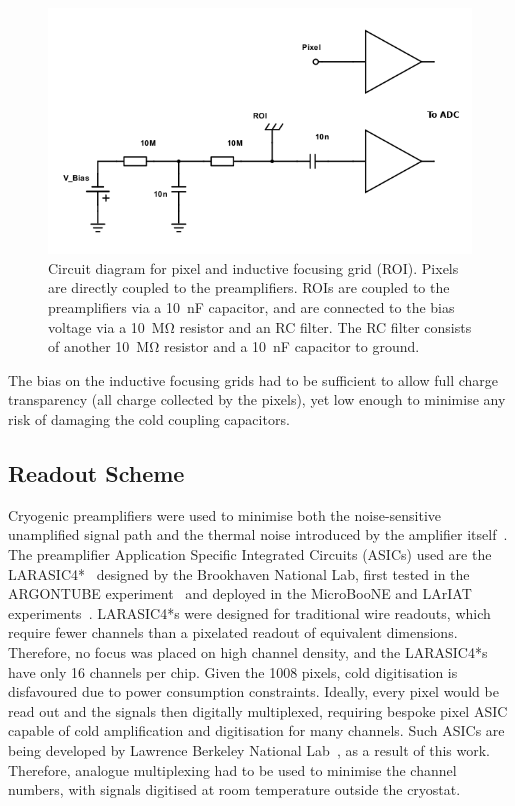 \documentclass[instruments,article,submit,moreauthors,pdftex]{Definitions/mdpi}
\begin{document}
\begin{figure}[htb]
	\centering
	\includegraphics[width=0.65\linewidth]{Figures/schemeit-project_mod}
	\caption{Circuit diagram for pixel and inductive focusing grid (ROI). Pixels are directly coupled to the preamplifiers. ROIs are coupled to the preamplifiers via a \SI{10}{\nano\farad} capacitor, and are connected to the bias voltage via a \SI{10}{\mega\ohm} resistor and an RC filter. The RC filter consists of another \SI{10}{\mega\ohm} resistor and a \SI{10}{\nano\farad} capacitor to ground.}
	\label{fig:circuit}
\end{figure}

The bias on the inductive focusing grids had to be sufficient to allow full charge transparency (all charge collected by the pixels), yet low enough to minimise any risk of damaging the cold coupling capacitors.

\subsection{Readout Scheme}

Cryogenic preamplifiers were used to minimise both the noise-sensitive unamplified signal path and the thermal noise introduced by the amplifier itself~\cite{art_cold_ero}.
The preamplifier Application Specific Integrated Circuits (ASICs) used are the LARASIC4*~\cite{larasic} designed by the Brookhaven National Lab, first tested in the ARGONTUBE experiment~\cite{art_cold_ero} and deployed in the MicroBooNE and LArIAT experiments~\cite{uboner,lariat}.
LARASIC4*s were designed for traditional wire readouts, which require fewer channels than a pixelated readout of equivalent dimensions. 
Therefore, no focus was placed on high channel density, and the LARASIC4*s have only 16 channels per chip.
Given the 1008 pixels, cold digitisation is disfavoured due to power consumption constraints. 
Ideally, every pixel would be read out and the signals then digitally multiplexed, requiring bespoke pixel ASIC capable of cold amplification and digitisation for many channels.
Such ASICs are being developed by Lawrence Berkeley National Lab~\cite{larpix}, as a result of this work. 
Therefore, analogue multiplexing had to be used to minimise the channel numbers, with signals digitised at room temperature outside the cryostat.
\end{document}
